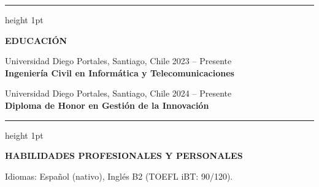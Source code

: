 \documentclass[10pt,a4paper]{article}
\newcommand{\cvsection}[1]{
    \vspace{1em}
    \hrule height 1pt
    \vspace{0.4em}
    \begin{center}
        \textbf{\large #1}
    \end{center}
    \vspace{-0.5em}
}
\begin{document}
\cvsection{EDUCACIÓN}

\noindent Universidad Diego Portales, Santiago, Chile \hfill 2023 – Presente\\[0.2em]
\textbf{Ingeniería Civil en Informática y Telecomunicaciones}
\vspace{-0.3em}

\vspace{0.8em}
\noindent Universidad Diego Portales, Santiago, Chile \hfill 2024 – Presente\\[0.2em]
\textbf{Diploma de Honor en Gestión de la Innovación}


\cvsection{HABILIDADES PROFESIONALES Y PERSONALES}
\begin{center}
    \small Idiomas: Español (nativo), Inglés B2 (TOEFL iBT: 90/120).
\end{center}
\end{document}
